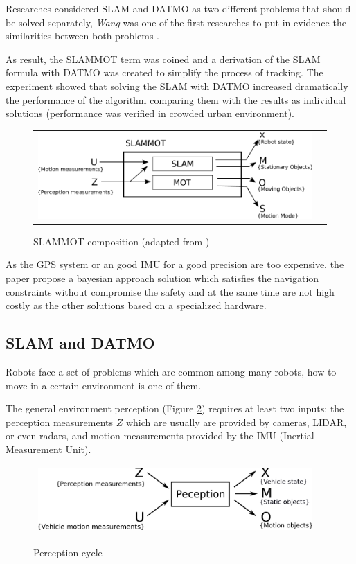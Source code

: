 Researches considered SLAM and DATMO as two different problems that should be solved separately, \textit{Wang} was one of the first researches to put in evidence the similarities between both problems \cite{Wang03onlinesimultaneous}.

As result, the SLAMMOT term was coined and a derivation of the SLAM formula with DATMO was created to simplify the process of tracking. The experiment showed that solving the SLAM with DATMO increased dramatically the performance of the algorithm comparing them with the results as individual solutions (performance was verified in crowded urban environment).

\begin{figure}[h]
   \centering
     \begin{tabular}{lr}
       \includegraphics[scale=0.9]{img/fig:slammot}
     \end{tabular}
   \caption{SLAMMOT composition (adapted from \cite{Wang04a})}
   \label{fig:slammot}
 \end{figure}

As the GPS system or an good IMU for a good precision are too expensive, the paper propose a bayesian approach solution which satisfies the navigation constraints without compromise the safety and at the same time are not high costly as the other solutions based on a specialized hardware.

\subsection{SLAM and DATMO}

Robots face a set of problems which are common among many robots, how to move in a certain environment is one of them.

The general environment perception (Figure \ref{fig:perception:cycle}) requires at least two inputs: the perception measurements $Z$ which are usually are provided by cameras, LIDAR, or even radars, and motion measurements provided by the IMU (Inertial Measurement Unit).

\begin{figure}[h]
   \centering
     \begin{tabular}{lr}
       \includegraphics[scale=0.5]{img/fig:perception:cycle}
     \end{tabular}
   \caption{Perception cycle}
   \label{fig:perception:cycle}
 \end{figure}


